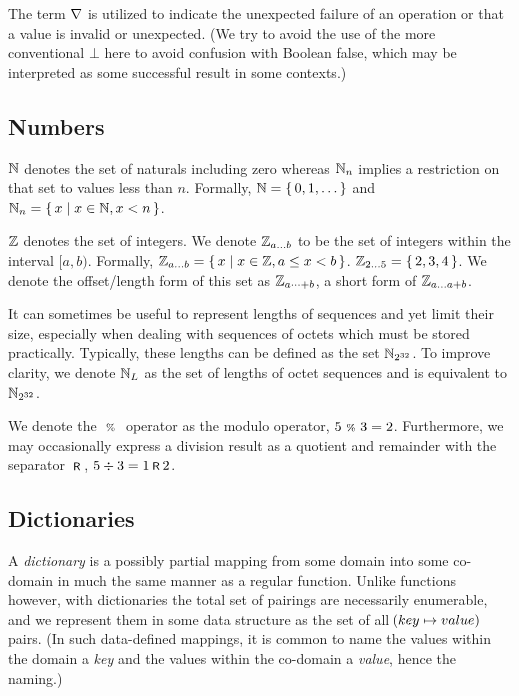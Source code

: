 The term $\nabla$ is utilized to indicate the unexpected failure of an operation or that a value is invalid or unexpected. (We try to avoid the use of the more conventional $\bot$ here to avoid confusion with Boolean false, which may be interpreted as some successful result in some contexts.)

\subsection{Numbers}\label{sec:numbers}

$\mathbb{N}$ denotes the set of naturals including zero whereas $\mathbb{N}_{n}$ implies a restriction on that set to values less than $n$. Formally, $\N = \set{0, 1, \dots}$ and $\Nmax{n} = \set{\build{x}{x \in \N, x < n}}$.

$\mathbb{Z}$ denotes the set of integers. We denote $\mathbb{Z}_{a \dots b}$ to be the set of integers within the interval $[a, b)$. Formally, $\Z\interval{a}{b} = \set{\build{x}{x \in \Z, a \le x < b}}$. \Eg $\Z\interval{2}{5} = \set{2, 3, 4}$. We denote the offset/length form of this set as $\mathbb{Z}_{a \dots+ b}$, a short form of $\mathbb{Z}_{a \dots a+b}$.

It can sometimes be useful to represent lengths of sequences and yet limit their size, especially when dealing with sequences of octets which must be stored practically. Typically, these lengths can be defined as the set $\mathbb{N}_{2^{32}}$. To improve clarity, we denote $\mathbb{N}_L$ as the set of lengths of octet sequences and is equivalent to $\mathbb{N}_{2^{32}}$.

We denote the $\ \text{\scriptsize{\%}}\ $ operator as the modulo operator, \eg $5 \ \text{\scriptsize{\%}}\  3 = 2$. Furthermore, we may occasionally express a division result as a quotient and remainder with the separator $\text{\hspace{2pt}\footnotesize{\textsf{R}}\hspace{2pt}}$, \eg $5 \div 3 = 1 \text{\hspace{2pt}\footnotesize{\textsf{R}}\hspace{2pt}} 2$.

\subsection{Dictionaries}\label{sec:dictionaries}

A \emph{dictionary} is a possibly partial mapping from some domain into some co-domain in much the same manner as a regular function. Unlike functions however, with dictionaries the total set of pairings are necessarily enumerable, and we represent them in some data structure as the set of all $\kv{key}{value}$ pairs. (In such data-defined mappings, it is common to name the values within the domain a \emph{key} and the values within the co-domain a \emph{value}, hence the naming.)

